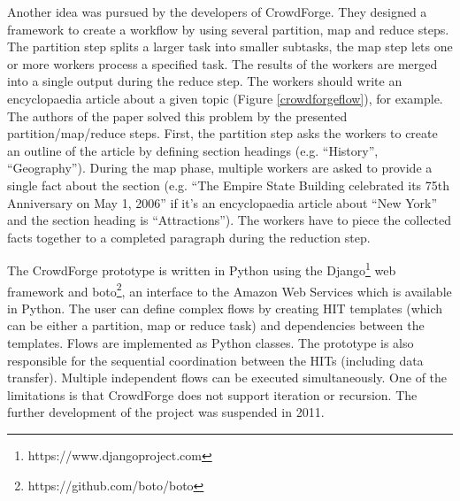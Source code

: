 Another idea was pursued by the developers of CrowdForge\cite{crowdforge}. They designed a framework to create a workflow by using several partition, map and reduce steps. The partition step splits a larger task into smaller subtasks, the map step lets one or more workers process a specified task. The results of the workers are merged into a single output during the reduce step. The workers should write an encyclopaedia article about a given topic (Figure \ref{crowdforgeflow}), for example. The authors of the paper solved this problem by the presented partition/map/reduce steps. First, the partition step asks the workers to create an outline of the article by defining section headings (e.g. ``History'', ``Geography''). During the map phase, multiple workers are asked to provide a single fact about the section (e.g. ``The Empire State Building celebrated its 75th Anniversary on May 1, 2006'' if it's an encyclopaedia article about ``New York'' and the section heading is ``Attractions''). The workers have to piece the collected facts together to a completed paragraph during the reduction step.

The CrowdForge prototype is written in Python using the Django\footnote{https://www.djangoproject.com} web framework and boto\footnote{https://github.com/boto/boto}, an interface to the Amazon Web Services which is available in Python. The user can define complex flows by creating HIT templates (which can be either a partition, map or reduce task) and dependencies between the templates. Flows are implemented as Python classes. The prototype is also responsible for the sequential coordination between the HITs (including data transfer). Multiple independent flows can be executed simultaneously. One of the limitations is that CrowdForge does not support iteration or recursion. The further development of the project was suspended in 2011.

